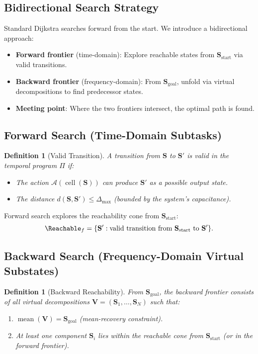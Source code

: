 \documentclass[twocolumn,11pt,a4paper]{article}
\newtheorem{definition}[theorem]{Definition}
\newcommand{\Stuple}{\mathbf{S}}
\DeclareMathOperator{\cell}{cell}
\DeclareMathOperator{\mean}{mean}
\begin{document}
\subsection{Bidirectional Search Strategy}

Standard Dijkstra searches forward from the start. We introduce a bidirectional approach:

\begin{itemize}[nosep,leftmargin=1em]
  \item \textbf{Forward frontier} (time-domain): Explore reachable states from $\Stuple_{\text{start}}$ via valid transitions.
  \item \textbf{Backward frontier} (frequency-domain): From $\Stuple_{\text{goal}}$, unfold via virtual decompositions to find predecessor states.
  \item \textbf{Meeting point}: Where the two frontiers intersect, the optimal path is found.
\end{itemize}

\subsection{Forward Search (Time-Domain Subtasks)}

\begin{definition}[Valid Transition]
A transition from $\Stuple$ to $\Stuple'$ is \emph{valid} in the temporal program $\Pi$ if:
\begin{itemize}[nosep,leftmargin=1em]
  \item The action $\mathcal{A}(\cell(\Stuple))$ can produce $\Stuple'$ as a possible output state.
  \item The distance $d(\Stuple, \Stuple') \leq \Delta_{\max}$ (bounded by the system's capacitance).
\end{itemize}
\end{definition}

Forward search explores the reachability cone from $\Stuple_{\text{start}}$:
\begin{equation}
  \Reachable_f = \{\Stuple' : \text{valid transition from } \Stuple_{\text{start}} \text{ to } \Stuple'\}.
\end{equation}

\subsection{Backward Search (Frequency-Domain Virtual Substates)}

\begin{definition}[Backward Reachability]
From $\Stuple_{\text{goal}}$, the backward frontier consists of all virtual decompositions $\mathbf{V} = (\Stuple_1, \ldots, \Stuple_N)$ such that:
\begin{enumerate}[nosep,label=(\roman*)]
  \item $\mean(\mathbf{V}) = \Stuple_{\text{goal}}$ (mean-recovery constraint).
  \item At least one component $\Stuple_i$ lies within the reachable cone from $\Stuple_{\text{start}}$ (or in the forward frontier).
\end{enumerate}
\end{definition}
\end{document}
